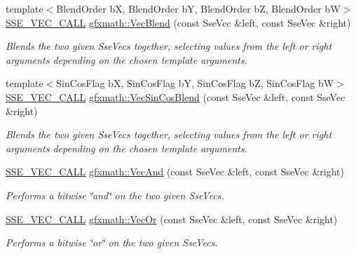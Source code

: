 \begin{DoxyCompactItemize}
{\footnotesize template$<$Blend\+Order b\+X, Blend\+Order b\+Y, Blend\+Order b\+Z, Blend\+Order b\+W$>$ }\\\hyperlink{ssevec__math__defs_8h_a97454f977a5281455cecacce1e8ba670}{S\+S\+E\+\_\+\+V\+E\+C\+\_\+\+C\+A\+L\+L} \hyperlink{group___s_i_m_d_vec_math_gabd3f3903877408b4a856e06f97ef7487}{gfxmath\+::\+Vec\+Blend} (const Sse\+Vec \&left, const Sse\+Vec \&right)
\begin{DoxyCompactList}\small\item\em Blends the two given Sse\+Vecs together, selecting values from the left or right arguments depending on the chosen template arguments. \end{DoxyCompactList}\item 
{\footnotesize template$<$Sin\+Cos\+Flag b\+X, Sin\+Cos\+Flag b\+Y, Sin\+Cos\+Flag b\+Z, Sin\+Cos\+Flag b\+W$>$ }\\\hyperlink{ssevec__math__defs_8h_a97454f977a5281455cecacce1e8ba670}{S\+S\+E\+\_\+\+V\+E\+C\+\_\+\+C\+A\+L\+L} \hyperlink{group___s_i_m_d_vec_math_ga739220633256cf9a783d826ce991915d}{gfxmath\+::\+Vec\+Sin\+Cos\+Blend} (const Sse\+Vec \&left, const Sse\+Vec \&right)
\begin{DoxyCompactList}\small\item\em Blends the two given Sse\+Vecs together, selecting values from the left or right arguments depending on the chosen template arguments. \end{DoxyCompactList}\item 
\hyperlink{ssevec__math__defs_8h_a97454f977a5281455cecacce1e8ba670}{S\+S\+E\+\_\+\+V\+E\+C\+\_\+\+C\+A\+L\+L} \hyperlink{group___s_i_m_d_vec_math_ga027001ac65c982829abc16517464705e}{gfxmath\+::\+Vec\+And} (const Sse\+Vec \&left, const Sse\+Vec \&right)
\begin{DoxyCompactList}\small\item\em Performs a bitwise \char`\"{}and\char`\"{} on the two given Sse\+Vecs. \end{DoxyCompactList}\item 
\hyperlink{ssevec__math__defs_8h_a97454f977a5281455cecacce1e8ba670}{S\+S\+E\+\_\+\+V\+E\+C\+\_\+\+C\+A\+L\+L} \hyperlink{group___s_i_m_d_vec_math_gade7845a224fe159174b997a03e17f9d6}{gfxmath\+::\+Vec\+Or} (const Sse\+Vec \&left, const Sse\+Vec \&right)
\begin{DoxyCompactList}\small\item\em Performs a bitwise \char`\"{}or\char`\"{} on the two given Sse\+Vecs. \end{DoxyCompactList}\item 

\end{DoxyCompactItemize}
